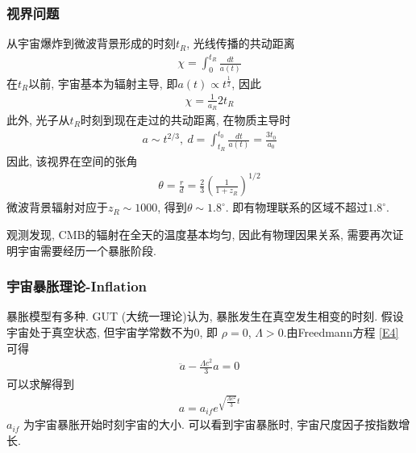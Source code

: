 \subsubsection{视界问题}

从宇宙爆炸到微波背景形成的时刻$t_R$, 光线传播的共动距离
\begin{align*}
    \chi=\int_0^{t_R}\frac{dt}{a(t)}
\end{align*}
在$t_R$以前, 宇宙基本为辐射主导, 即$a(t)\propto t^{\frac{1}{2}}$, 因此
\begin{align*}
    \chi=\frac{1}{a_R}2t_R
\end{align*}
此外, 光子从$t_R$时刻到现在走过的共动距离, 在物质主导时
\begin{align*}
    a\sim t^{2/3},\ d=\int_{t_R}^{t_0}\frac{dt}{a(t)}=\frac{3t_0}{a_0}
\end{align*}
因此,  该视界在空间的张角
\begin{align*}
    \theta=\frac{r}{d}=\frac{2}{3}\left( \frac{1}{1+z_R} \right)^{1/2}
\end{align*}
微波背景辐射对应于$z_R\sim 1000$, 得到$\theta\sim 1.8^{\circ}$. 即有物理联系的区域不超过$1.8^{\circ}$. 

\begin{figure}[!htb]
    \centering
\end{figure}

观测发现, CMB的辐射在全天的温度基本均匀, 因此有物理因果关系, 需要再次证明宇宙需要经历一个暴胀阶段. 

\subsubsection{宇宙暴胀理论-Inflation}
暴胀模型有多种.  GUT (大统一理论)认为, 暴胀发生在真空发生相变的时刻. 假设宇宙处于真空状态, 但宇宙学常数不为0, 即 $\rho=0$, $\Lambda>0$.由Freedmann方程 \ref{E4} 可得
\begin{align*}
    \ddot{a}-\frac{\Lambda c^2}{3}a=0
\end{align*}
可以求解得到
\begin{align*}
    a=a_{if}e^{\sqrt{\frac{\Lambda c^2}{3}}t}
\end{align*}
$a_{if}$ 为宇宙暴胀开始时刻宇宙的大小. 可以看到宇宙暴胀时, 宇宙尺度因子按指数增长. 

